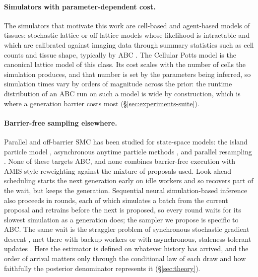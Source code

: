 \documentclass[10pt]{article}
\theoremstyle{plain}
\theoremstyle{definition}
\begin{document}
\paragraph{Simulators with parameter-dependent cost.} The simulators that motivate this work are cell-based and agent-based models of tissues: stochastic lattice or off-lattice models whose likelihood is intractable and which are calibrated against imaging data through summary statistics such as cell counts and tissue shape, typically by ABC \citep{kursawe2018abc,lambert2018agent}. The Cellular Potts model \citep{graner1992cpm,hirashima2017cpm} is the canonical lattice model of this class. Its cost scales with the number of cells the simulation produces, and that number is set by the parameters being inferred, so simulation times vary by orders of magnitude across the prior: the runtime distribution of an ABC run on such a model is wide by construction, which is where a generation barrier costs most (\S\ref{sec:experiments-suite}).

\paragraph{Barrier-free sampling elsewhere.} Parallel and off-barrier SMC has been studied for state-space models: the island particle model \citep{verge2015island}, asynchronous anytime particle methods \citep{paige2014cascade}, and parallel resampling \citep{murray2016anytime}. None of these targets ABC, and none combines barrier-free execution with AMIS-style reweighting against the mixture of proposals used. Look-ahead scheduling \citep{alamoudi2024lookahead} starts the next generation early on idle workers and so recovers part of the wait, but keeps the generation. Sequential neural simulation-based inference \citep{papamakarios2016snpe,greenberg2019apt,lueckmann2021benchmark} also proceeds in rounds, each of which simulates a batch from the current proposal and retrains before the next is proposed, so every round waits for its slowest simulation as a generation does; the sampler we propose is specific to ABC. The same wait is the straggler problem of synchronous stochastic gradient descent \citep{dean2012distbelief,chen2016revisiting}, met there with backup workers or with asynchronous, staleness-tolerant updates \citep{recht2011hogwild}. Here the estimator is defined on whatever history has arrived, and the order of arrival matters only through the conditional law of each draw and how faithfully the posterior denominator represents it (\S\ref{sec:theory}).
\end{document}
